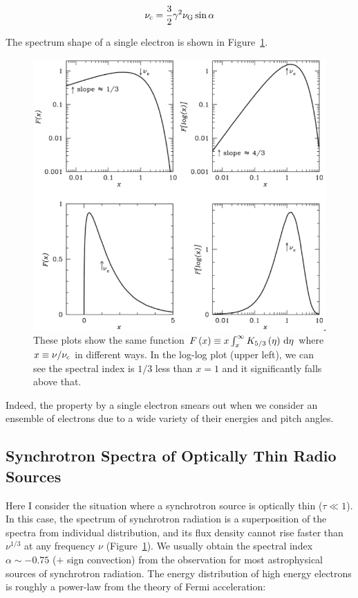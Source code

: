 \begin{equation}\label{eq:essential_radio5n67}
    \nu_{\mathrm{c}} = \frac{3}{2} \gamma^2 \nu_{\mathrm{G}} \sin \alpha
\end{equation}

The spectrum shape of a single electron is shown in Figure~\ref{fig:nrao_radio5n6}.

\begin{figure}[htbp]
	\centering
	\includegraphics[width=.7\linewidth]{Chapter_2/Figures/NRAO_radio5n6.png}
    \caption[The synchrotron spectrum of a single electron]{\label{fig:nrao_radio5n6}
        These plots show the same function $F\left(x\right) \equiv x\int^{\infty}_x K_{5/3}\left(\eta\right)\,\mathrm{d}\eta$ where $x \equiv \nu / \nu_{\mathrm{c}}$ in different ways.
        In the log-log plot (upper left), we can see the spectral index is $1/3$ less than $x=1$ and it significantly falls above that.
    }
\end{figure}

Indeed, the property by a single electron smears out when we consider an ensemble of electrons due to a wide variety of their energies and pitch angles.


\subsection{Synchrotron Spectra of Optically Thin Radio Sources}\label{subsec:synchrotronspectra_opticallythin}
Here I consider the situation where a synchrotron source is optically thin ($\tau \ll 1$).
In this case, the spectrum of synchrotron radiation is a superposition of the spectra from individual distribution, and its flux density cannot rise faster than $\nu^{1/3}$ at any frequency $\nu$ (Figure~\ref{fig:nrao_radio5n6}).
We usually obtain the spectral index $\alpha\sim-0.75$ ($+$ sign convection) from the observation for most astrophysical sources of synchrotron radiation.
The energy distribution of high energy electrons is roughly a power-law from the theory of Fermi acceleration:


